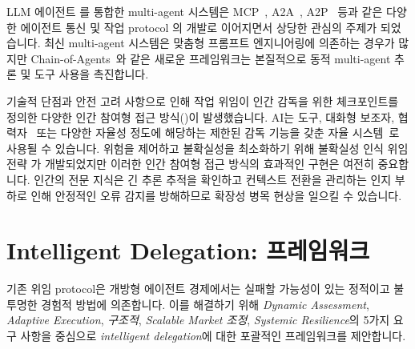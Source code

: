 \documentclass[11pt, a4paper, twocolumn, copyright, goog]{google}
\begin{document}
LLM 에이전트 \citep{qian2024scaling, guo2024large, tran2025multiagentcollaborationmechanismssurvey}를 통합한 multi-agent 시스템은 MCP~\citep{mcp, mcp2, luo2025mcp, xing2025mcp, singh2025survey, radosevich2025mcp}, A2A~\citep{agent2agent}, A2P~\citep{a2p} 등과 같은 다양한 에이전트 통신 및 작업 protocol \citep{ehtesham2025survey, zou2025blocka2a, neelou2025a2asagenticairuntime}의 개발로 이어지면서 상당한 관심의 주제가 되었습니다. 최신 multi-agent 시스템은 맞춤형 프롬프트 엔지니어링에 의존하는 경우가 많지만 Chain-of-Agents~\citep{li2025chainofagentsendtoendagentfoundation}와 같은 새로운 프레임워크는 본질적으로 동적 multi-agent 추론 및 도구 사용을 촉진합니다. 

기술적 단점과 안전 고려 사항으로 인해 작업 위임이 인간 감독을 위한 체크포인트를 정의한 다양한 인간 참여형 접근 방식(\citep{zanzotto2019human, mosqueira2023human, retzlaff2024human, drori2024human, akbar2024towards, takerngsaksiri2025human})이 발생했습니다. AI는 도구, 대화형 보조자, 협력자~\citep{fuchs2023optimizing} 또는 다양한 자율성 정도에 해당하는 제한된 감독 기능을 갖춘 자율 시스템~\citep{falcone2002human}로 사용될 수 있습니다. 위험을 제어하고 불확실성을 최소화하기 위해 불확실성 인식 위임 전략 \citep{lee2025towards}가 개발되었지만 이러한 인간 참여형 접근 방식의 효과적인 구현은 여전히 중요합니다. 인간의 전문 지식은 긴 추론 추적을 확인하고 컨텍스트 전환을 관리하는 인지 부하로 인해 안정적인 오류 감지를 방해하므로 확장성 병목 현상을 일으킬 수 있습니다.

\section{Intelligent Delegation: 프레임워크}

기존 위임 protocol은 개방형 에이전트 경제에서는 실패할 가능성이 있는 정적이고 불투명한 경험적 방법에 의존합니다. 이를 해결하기 위해 \emph{Dynamic Assessment}, \emph{Adaptive Execution}, \emph{구조적}, \emph{Scalable Market 조정}, \emph{Systemic Resilience}의 5가지 요구 사항을 중심으로 \emph{intelligent delegation}에 대한 포괄적인 프레임워크를 제안합니다.
\end{document}
